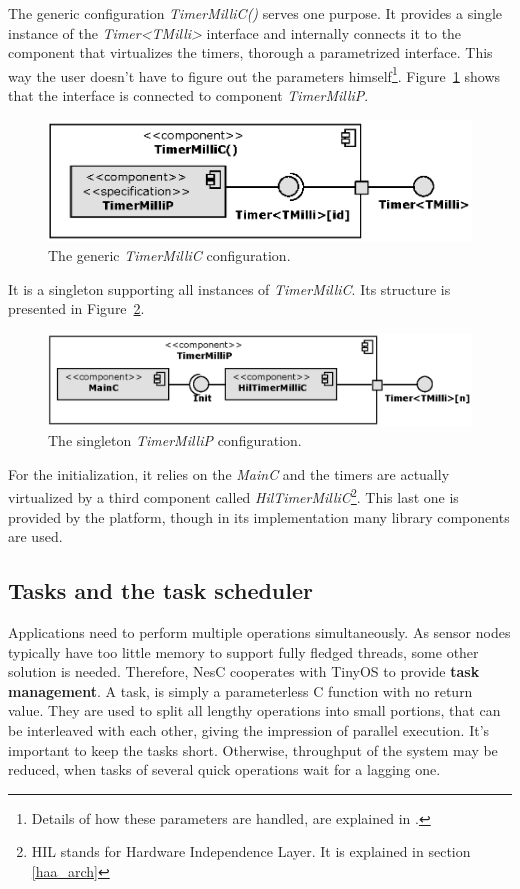 The generic configuration \emph{TimerMilliC()} serves one purpose. It
provides a single instance of the \emph{Timer<TMilli>} interface and
internally connects it to the component that virtualizes the timers,
thorough a parametrized interface. This way the user doesn't have to
figure out the parameters himself\footnote{Details of how these
parameters are handled, are explained in \cite[ch. 6]{TOSProg}.}.
Figure~\ref{fig:timermillic} shows that the interface is connected to
component \emph{TimerMilliP}.
\begin{figure}[h]
  \centering
  \includegraphics{diagrams/timermillic.eps}
  \caption{The generic \emph{TimerMilliC} configuration.}
  \label{fig:timermillic}
\end{figure}
It is a singleton supporting all instances of \emph{TimerMilliC}. Its
structure is presented in Figure~\ref{fig:timermillip}.
\begin{figure}[h]
  \centering
  \includegraphics{diagrams/timermillip.eps}
  \caption{The singleton \emph{TimerMilliP} configuration.}
  \label{fig:timermillip}
\end{figure}
For the initialization, it relies on the \emph{MainC}
and the timers are actually virtualized by a third component called
\emph{HilTimerMilliC}\footnote{HIL stands for Hardware Independence
Layer. It is explained in section \ref{haa_arch}}. This last one is
provided by the platform, though in its implementation many library
components are used.

\subsection{Tasks and the task scheduler}

Applications need to perform multiple operations simultaneously. As
sensor nodes typically have too little memory to support fully fledged
threads, some other solution is needed. Therefore, NesC cooperates with
TinyOS to provide {\bf task management}. A task, is simply a
parameterless C function with no return value. They are used to split
all lengthy operations into small portions, that can be interleaved
with each other, giving the impression of parallel execution. It's
important to keep the tasks short. Otherwise, throughput of the system
may be reduced, when tasks of several quick operations wait for a
lagging one.

